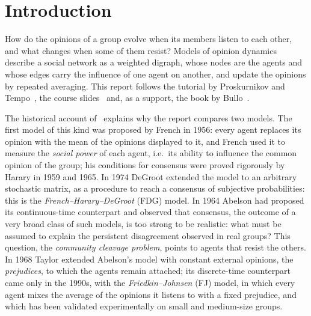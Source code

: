 \section{Introduction}
\label{sec:intro}

How do the opinions of a group evolve when its members listen to each other, and what
changes when some of them resist? Models of opinion dynamics describe a social network
as a weighted digraph, whose nodes are the agents and whose edges carry the influence of
one agent on another, and update the opinions by repeated averaging. This report follows
the tutorial by Proskurnikov and Tempo~\cite{proskurnikov2017tutorial}, the course
slides~\cite{baggio_graph,baggio_matrix,baggio_dt} and, as a support, the book by
Bullo~\cite{bullo2024lns}.

The historical account of~\cite{proskurnikov2017tutorial} explains why the report
compares two models. The first model of this kind was proposed by French in 1956: every
agent replaces its opinion with the mean of the opinions displayed to it, and French used
it to measure the \emph{social power} of each agent, i.e.\ its ability to influence the
common opinion of the group; his conditions for consensus were proved rigorously by
Harary in 1959 and 1965. In 1974 DeGroot extended the model to an arbitrary stochastic
matrix, as a procedure to reach a consensus of subjective probabilities: this is the
\emph{French--Harary--DeGroot} (FDG) model. In 1964 Abelson had proposed its
continuous-time counterpart and observed that consensus, the outcome of a very broad
class of such models, is too strong to be realistic: what must be assumed to explain the
persistent disagreement observed in real groups? This question, the \emph{community
cleavage problem}, points to agents that resist the others. In 1968 Taylor extended
Abelson's model with constant external opinions, the \emph{prejudices}, to which the
agents remain attached; its discrete-time counterpart came only in the 1990s, with the
\emph{Friedkin--Johnsen} (FJ) model, in which every agent mixes the average of the
opinions it listens to with a fixed prejudice, and which has been validated
experimentally on small and medium-size groups.

